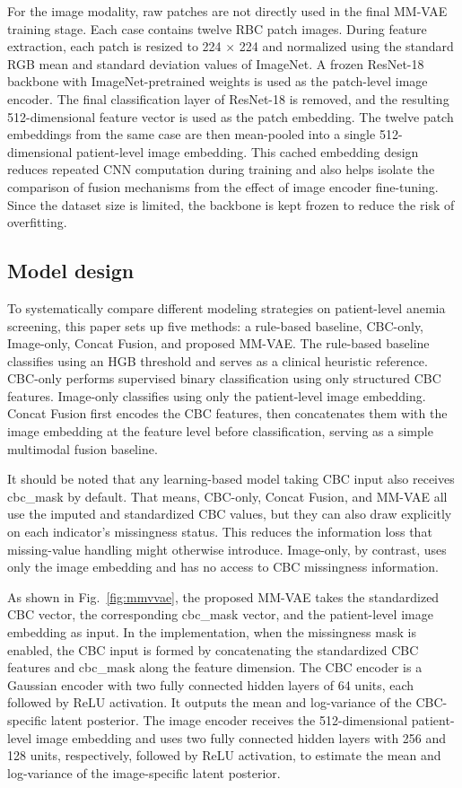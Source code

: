 \documentclass[conference]{IEEEtran}
\begin{document}
For the image modality, raw patches are not directly used in the final MM-VAE training stage. Each case contains twelve RBC patch images. During feature extraction, each patch is resized to 224 $\times$ 224 and normalized using the standard RGB mean and standard deviation values of ImageNet. A frozen ResNet-18 backbone with ImageNet-pretrained weights is used as the patch-level image encoder. The final classification layer of ResNet-18 is removed, and the resulting 512-dimensional feature vector is used as the patch embedding. The twelve patch embeddings from the same case are then mean-pooled into a single 512-dimensional patient-level image embedding. This cached embedding design reduces repeated CNN computation during training and also helps isolate the comparison of fusion mechanisms from the effect of image encoder fine-tuning. Since the dataset size is limited, the backbone is kept frozen to reduce the risk of overfitting.

\subsection{Model design}

To systematically compare different modeling strategies on patient-level anemia screening, this paper sets up five methods: a rule-based baseline, CBC-only, Image-only, Concat Fusion, and proposed MM-VAE. The rule-based baseline classifies using an HGB threshold and serves as a clinical heuristic reference. CBC-only performs supervised binary classification using only structured CBC features. Image-only classifies using only the patient-level image embedding. Concat Fusion first encodes the CBC features, then concatenates them with the image embedding at the feature level before classification, serving as a simple multimodal fusion baseline.

It should be noted that any learning-based model taking CBC input also receives cbc\_mask by default. That means, CBC-only, Concat Fusion, and MM-VAE all use the imputed and standardized CBC values, but they can also draw explicitly on each indicator's missingness status. This reduces the information loss that missing-value handling might otherwise introduce. Image-only, by contrast, uses only the image embedding and has no access to CBC missingness information.

As shown in Fig.~\ref{fig:mmvvae}, the proposed MM-VAE takes the standardized CBC vector, the corresponding cbc\_mask vector, and the patient-level image embedding as input. In the implementation, when the missingness mask is enabled, the CBC input is formed by concatenating the standardized CBC features and cbc\_mask along the feature dimension. The CBC encoder is a Gaussian encoder with two fully connected hidden layers of 64 units, each followed by ReLU activation. It outputs the mean and log-variance of the CBC-specific latent posterior. The image encoder receives the 512-dimensional patient-level image embedding and uses two fully connected hidden layers with 256 and 128 units, respectively, followed by ReLU activation, to estimate the mean and log-variance of the image-specific latent posterior.
\end{document}
